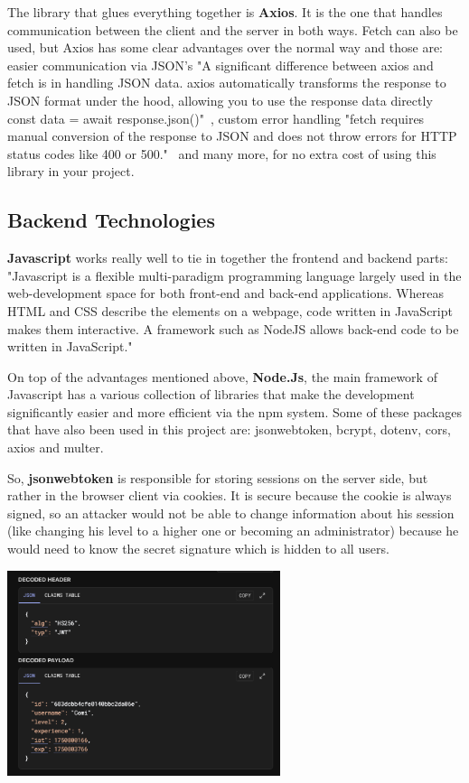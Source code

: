 \documentclass[12pt,a4paper]{report}
\begin{document}
The library that glues everything together is \textbf{Axios}. It is the one that handles communication between the client and the server in both ways. Fetch can also be used, but Axios has some clear advantages over the normal way and those are: easier communication via JSON's "A significant difference between axios and fetch is in handling JSON data. axios automatically transforms the response to JSON format under the hood, allowing you to use the response data directly const data = await response.json()"~\cite{axiosVsFetch}, custom error handling "fetch requires manual conversion of the response to JSON and does not throw errors for HTTP status codes like 400 or 500."~\cite{axiosVsFetch} and many more, for no extra cost of using this library in your project.

\subsection{Backend Technologies}

\textbf{Javascript} works really well to tie in together the frontend and backend parts: "Javascript is a flexible multi-paradigm programming language largely used in the web-development space for both front-end and back-end applications. Whereas HTML and CSS describe the elements on a webpage, code written in JavaScript makes them interactive. A framework such as NodeJS allows back-end code to be written in JavaScript."~\cite{JavaScript}

On top of the advantages mentioned above, \textbf{Node.Js}, the main framework of Javascript has a various collection of libraries that make the development significantly easier and more efficient via the npm system. Some of these packages that have also been used in this project are: jsonwebtoken, bcrypt, dotenv, cors, axios and multer.

So, \textbf{jsonwebtoken} is responsible for storing sessions on the server side, but rather in the browser client via cookies. It is secure because the cookie is always signed, so an attacker would not be able to change information about his session (like changing his level to a higher one or becoming an administrator) because he would need to know the secret signature which is hidden to all users.

\begin{center}
\includegraphics[width=0.6\textwidth]{images/token.png}
\end{center}
\end{document}
